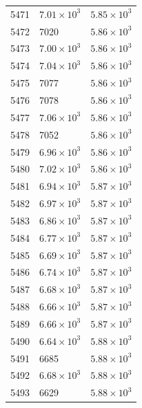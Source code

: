 \begin{table}[H]
\begin{tabular}{lll}
5471 & $\displaystyle 7.01 \times 10^{3}$ & $\displaystyle 5.85 \times 10^{3}$ \\
5472 & 7020 & $\displaystyle 5.86 \times 10^{3}$ \\
5473 & $\displaystyle 7.00 \times 10^{3}$ & $\displaystyle 5.86 \times 10^{3}$ \\
5474 & $\displaystyle 7.04 \times 10^{3}$ & $\displaystyle 5.86 \times 10^{3}$ \\
5475 & 7077 & $\displaystyle 5.86 \times 10^{3}$ \\
5476 & 7078 & $\displaystyle 5.86 \times 10^{3}$ \\
5477 & $\displaystyle 7.06 \times 10^{3}$ & $\displaystyle 5.86 \times 10^{3}$ \\
5478 & 7052 & $\displaystyle 5.86 \times 10^{3}$ \\
5479 & $\displaystyle 6.96 \times 10^{3}$ & $\displaystyle 5.86 \times 10^{3}$ \\
5480 & $\displaystyle 7.02 \times 10^{3}$ & $\displaystyle 5.86 \times 10^{3}$ \\
5481 & $\displaystyle 6.94 \times 10^{3}$ & $\displaystyle 5.87 \times 10^{3}$ \\
5482 & $\displaystyle 6.97 \times 10^{3}$ & $\displaystyle 5.87 \times 10^{3}$ \\
5483 & $\displaystyle 6.86 \times 10^{3}$ & $\displaystyle 5.87 \times 10^{3}$ \\
5484 & $\displaystyle 6.77 \times 10^{3}$ & $\displaystyle 5.87 \times 10^{3}$ \\
5485 & $\displaystyle 6.69 \times 10^{3}$ & $\displaystyle 5.87 \times 10^{3}$ \\
5486 & $\displaystyle 6.74 \times 10^{3}$ & $\displaystyle 5.87 \times 10^{3}$ \\
5487 & $\displaystyle 6.68 \times 10^{3}$ & $\displaystyle 5.87 \times 10^{3}$ \\
5488 & $\displaystyle 6.66 \times 10^{3}$ & $\displaystyle 5.87 \times 10^{3}$ \\
5489 & $\displaystyle 6.66 \times 10^{3}$ & $\displaystyle 5.87 \times 10^{3}$ \\
5490 & $\displaystyle 6.64 \times 10^{3}$ & $\displaystyle 5.88 \times 10^{3}$ \\
5491 & 6685 & $\displaystyle 5.88 \times 10^{3}$ \\
5492 & $\displaystyle 6.68 \times 10^{3}$ & $\displaystyle 5.88 \times 10^{3}$ \\
5493 & 6629 & $\displaystyle 5.88 \times 10^{3}$ \\

\end{tabular}
\end{table}

